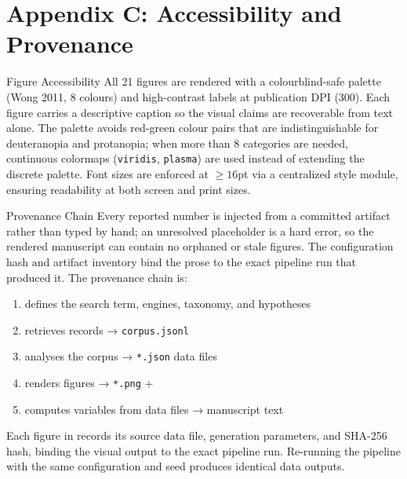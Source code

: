\documentclass[
  ignorenonframetext,
]{beamer}
\author{\texorpdfstring{}{}}
\date{}
\providecommand{\tightlist}{%
  \setlength{\itemsep}{0pt}\setlength{\parskip}{0pt}}
\begin{document}
\section{Appendix C: Accessibility and
Provenance}\label{appendix-c-accessibility-and-provenance}

\begin{frame}{Figure Accessibility}
\protect{}\label{figure-accessibility}
All 21 figures are rendered with a colourblind-safe palette (Wong 2011,
8 colours) and high-contrast labels at publication DPI (300). Each
figure carries a descriptive caption so the visual claims are
recoverable from text alone. The palette avoids red-green colour pairs
that are indistinguishable for deuteranopia and protanopia; when more
than 8 categories are needed, continuous colormaps (\texttt{viridis},
\texttt{plasma}) are used instead of extending the discrete palette.
Font sizes are enforced at \(\geq 16\)pt via a centralized style module,
ensuring readability at both screen and print sizes.
\end{frame}

\begin{frame}{Provenance Chain}
\protect{}\label{provenance-chain}
Every reported number is injected from a committed artifact rather than
typed by hand; an unresolved placeholder is a hard error, so the
rendered manuscript can contain no orphaned or stale figures. The
configuration hash and artifact inventory bind the prose to the exact
pipeline run that produced it. The provenance chain is:

\begin{enumerate}
\tightlist
\item
   defines the search term, engines,
  taxonomy, and hypotheses
\item
   retrieves records →
  \texttt{corpus.jsonl}
\item
   analyses the corpus →
  \texttt{*.json} data files
\item
   renders figures →
  \texttt{*.png} + 
\item
   computes variables from data
  files → manuscript text
\end{enumerate}

Each figure in  records its source data
file, generation parameters, and SHA-256 hash, binding the visual output
to the exact pipeline run. Re-running the pipeline with the same
configuration and seed produces identical data outputs.
\end{frame}
\end{document}
